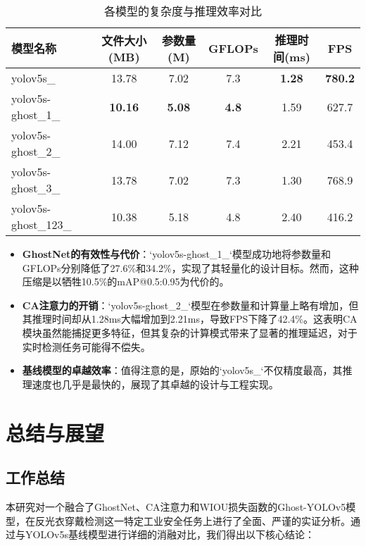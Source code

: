 \documentclass[a4paper]{ctexart}
\begin{document}
\begin{table}[H]
    \centering
    \caption{各模型的复杂度与推理效率对比}
    \label{tab:complexity-efficiency}
    \begin{tabular}{lccccc}
        \toprule
        \textbf{模型名称} & \textbf{文件大小(MB)} & \textbf{参数量(M)} & \textbf{GFLOPs} & \textbf{推理时间(ms)} & \textbf{FPS} \\
        \midrule
        yolov5s\_             & 13.78 & 7.02 & 7.3 & \textbf{1.28} & \textbf{780.2} \\
        yolov5s-ghost\_1\_    & \textbf{10.16} & \textbf{5.08} & \textbf{4.8} & 1.59 & 627.7 \\
        yolov5s-ghost\_2\_    & 14.00 & 7.12 & 7.4 & 2.21 & 453.4 \\
        yolov5s-ghost\_3\_    & 13.78 & 7.02 & 7.3 & 1.30 & 768.9 \\
        yolov5s-ghost\_123\_  & 10.38 & 5.18 & 4.8 & 2.40 & 416.2 \\
        \bottomrule
    \end{tabular}
\end{table}

\begin{itemize}
    \item \textbf{GhostNet的有效性与代价}：`yolov5s-ghost_1_`模型成功地将参数量和GFLOPs分别降低了27.6\%和34.2\%，实现了其轻量化的设计目标。然而，这种压缩是以牺牲10.5\%的mAP@0.5:0.95为代价的。
    \item \textbf{CA注意力的开销}：`yolov5s-ghost_2_`模型在参数量和计算量上略有增加，但其推理时间却从1.28ms大幅增加到2.21ms，导致FPS下降了42.4\%。这表明CA模块虽然能捕捉更多特征，但其复杂的计算模式带来了显著的推理延迟，对于实时检测任务可能得不偿失。
    \item \textbf{基线模型的卓越效率}：值得注意的是，原始的`yolov5s_`不仅精度最高，其推理速度也几乎是最快的，展现了其卓越的设计与工程实现。
\end{itemize}

\section{总结与展望}

\subsection{工作总结}
本研究对一个融合了GhostNet、CA注意力和WIOU损失函数的Ghost-YOLOv5模型，在反光衣穿戴检测这一特定工业安全任务上进行了全面、严谨的实证分析。通过与YOLOv5s基线模型进行详细的消融对比，我们得出以下核心结论：
\end{document}
